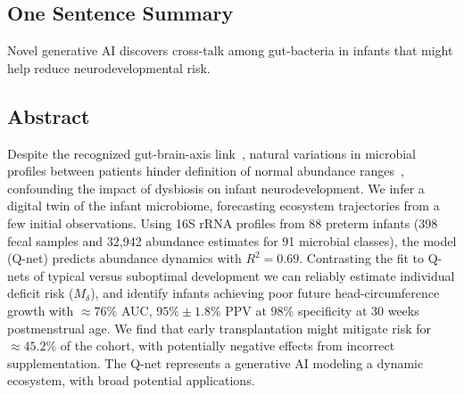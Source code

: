 \documentclass[onecolumn,10pt]{IEEEtran}
\title{\TITLE}
\author{\sffamily  \fontsize{10}{12}\selectfont Nicholas Sizemore$^{1}$, Kaitlyn Oliphant$^{2}$, Ruolin Zheng$^{1}$, Camilia R. Martin$^{6}$, Erika C. Claud$^{2,3}$ and Ishanu Chattopadhyay$^{1,4,5,7\bigstar}$\\ 
\vspace{10pt}

\sffamily  \fontsize{10}{12}\selectfont
$^{1}$Department of Medicine, University of Chicago, Chicago, IL 60637, USA\\ 
$^{2}$Department of Pediatrics, University of Chicago, Chicago, IL 60637, USA\\
$^{3}$Director, Neonatology Research, University of Chicago, Chicago, IL 60637, USA\\
$^{4}$Committee on Quantitative Methods in Social, Behavioral, and Health Sciences, University of Chicago, Chicago, IL 60637, USA\\
$^{5}$Committee on Genetics, Genomics \& Systems Biology, University of Chicago, Chicago, IL 60637, USA\\
$^{6}$Division of Neonatology, Weill Cornell Medicine, New York, NY 10021, USA\\
$^{7}$Center for Health Statistics, University of Chicago, Chicago, IL 60637, USA
\vskip 1em
$^\bigstar$To whom correspondence should be addressed: e-mail: \href{mailto:ishanu@uchicago.edu}{\texttt{ishanu@uchicago.edu}}.}
\title{\TITLE}
\def\qnet{Q-net\xspace}
\def\erisk{$M_\delta$\xspace}
\begin{document}
 
\maketitle 

\subsection*{One Sentence Summary}
Novel generative AI discovers cross-talk among gut-bacteria in infants that might help reduce neurodevelopmental risk.

\subsection*{Abstract}
Despite the recognized gut-brain-axis link~\cite{carlson2018infant}, natural variations in microbial profiles between patients hinder definition of normal abundance ranges~\cite{lozupone2012diversity}, confounding the impact of dysbiosis on infant neurodevelopment. We infer a digital twin of the infant microbiome, 
forecasting ecosystem trajectories from a few initial observations. Using 16S rRNA profiles from 88 preterm infants (398 fecal samples and 32,942 abundance estimates for 91 microbial classes), the model (\qnet) predicts abundance dynamics with $R^2=0.69$.  Contrasting the fit to \qnet{s} of typical versus suboptimal development we can reliably estimate individual deficit risk (\erisk), and identify infants achieving poor future head-circumference growth with  $\approx 76\%$ AUC, $95\%\pm 1.8\% $ PPV at $98\%$ specificity at 30 weeks postmenstrual age. We find that early transplantation might mitigate risk for $\approx 45.2\%$ of the cohort, with potentially negative effects from incorrect supplementation. The \qnet represents a generative AI modeling a dynamic ecosystem, with broad potential applications.


\end{document}
